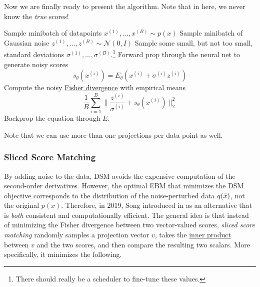 \documentclass{article}
\begin{document}
    \begin{algo}
      Now we are finally ready to present the algorithm. Note that in here, we never know the \textit{true} scores! 
      \begin{algorithm}[H]
      \caption{Denoised Score Matching}
      \label{alg:denoised_score_matching}
      \begin{algorithmic}[1]  

          \State Sample minibatch of datapoints $x^{(1)}, \ldots, x^{(B)} \sim p(x)$ 
          \State Sample minibatch of Gaussian noise $z^{(1)}, \ldots, z^{(B)} \sim \mathcal{N}(0, I)$ 
          \State Sample some small, but not too small, standard deviations $\sigma^{(1)}, \ldots, \sigma^{(B)}$.\footnote{There should really be a scheduler to fine-tune these values. }
          \State Forward prop through the neural net to generate noisy scores 
          \begin{equation}
            s_\theta (x^{(i)}) = E_\theta(x^{(i)} + \sigma^{(i)} z^{(i)})
          \end{equation}
          \State Compute the noisy \hyperref[def:fisher-divergence]{Fisher divergence} with empirical means 
          \begin{equation}
            \frac{1}{B} \sum_{i=1}^B \bigg\| \frac{z^{(i)}}{\sigma^{(i)}} + s_\theta (x^{(i)}) \bigg\|_2^2
          \end{equation} 
          \State Backprop the equation through $E$. 
        \EndWhile
      \end{algorithmic}
      \end{algorithm}
      Note that we can use more than one projections per data point as well. 
    \end{algo}

  \subsubsection{Sliced Score Matching}

    By adding noise to the data, DSM avoids the expensive computation of the second-order derivatives. However, the optimal EBM that minimizes the DSM objective corresponds to the distribution of the noise-perturbed data $q(\Tilde{x})$, not the original $p(x)$. Therefore, in 2019, Song introduced in \cite{sliced_score} as an alternative that is \textit{both} consistent and computationally efficient. The general idea is that instead of minimizing the Fisher divergence between two vector-valued scores, \textit{sliced score matching} randomly samples a projection vector $v$, takes the \hyperref[lin-def:inner-product]{inner product} between $v$ and the two scores, and then compare the resulting two scalars. More specifically, it minimizes the following. 
\end{document}
